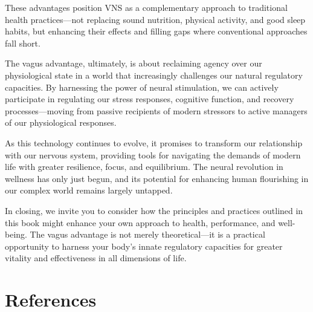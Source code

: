 \documentclass[
  Letterpaper,
]{scrbook}
\begin{document}
These advantages position VNS as a complementary approach to traditional
health practices---not replacing sound nutrition, physical activity, and
good sleep habits, but enhancing their effects and filling gaps where
conventional approaches fall short.

The vagus advantage, ultimately, is about reclaiming agency over our
physiological state in a world that increasingly challenges our natural
regulatory capacities. By harnessing the power of neural stimulation, we
can actively participate in regulating our stress responses, cognitive
function, and recovery processes---moving from passive recipients of
modern stressors to active managers of our physiological responses.

As this technology continues to evolve, it promises to transform our
relationship with our nervous system, providing tools for navigating the
demands of modern life with greater resilience, focus, and equilibrium.
The neural revolution in wellness has only just begun, and its potential
for enhancing human flourishing in our complex world remains largely
untapped.

In closing, we invite you to consider how the principles and practices
outlined in this book might enhance your own approach to health,
performance, and well-being. The vagus advantage is not merely
theoretical---it is a practical opportunity to harness your body's
innate regulatory capacities for greater vitality and effectiveness in
all dimensions of life.


\chapter*{References}\label{references}

\end{document}
